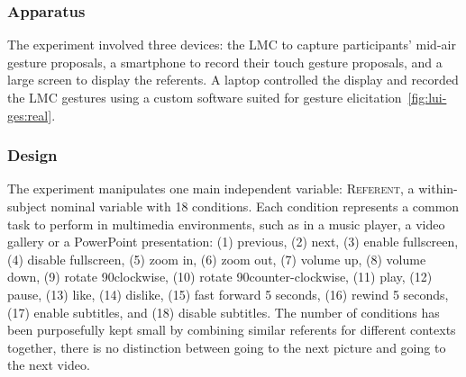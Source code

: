 \subsubsection{Apparatus}
The experiment involved three devices: the LMC to capture participants' mid-air gesture proposals, a smartphone to record their touch gesture proposals, and a large screen to display the referents. %
A laptop controlled the display and recorded the LMC gestures using a custom software suited for gesture elicitation~\ref{fig:lui-ges:real}.


\subsubsection{Design} 
The experiment manipulates one main independent variable:
\textsc{Referent}, a within-subject nominal variable with 18 conditions. Each condition represents a common task to perform in multimedia environments, such as in a music player, a video gallery or a PowerPoint presentation: (1) previous, (2) next, (3) enable fullscreen, (4) disable fullscreen, (5) zoom in, (6) zoom out, (7) volume up, (8) volume down, (9) rotate 90\textdegree clockwise, (10) rotate 90\textdegree counter-clockwise, (11) play, (12) pause, (13) like, (14) dislike, (15) fast forward 5 seconds, (16) rewind 5 seconds, (17) enable subtitles, and (18) disable subtitles. The number of conditions has been purposefully kept small by combining similar referents for different contexts together, \eg there is no distinction between going to the next picture and going to the next video.

